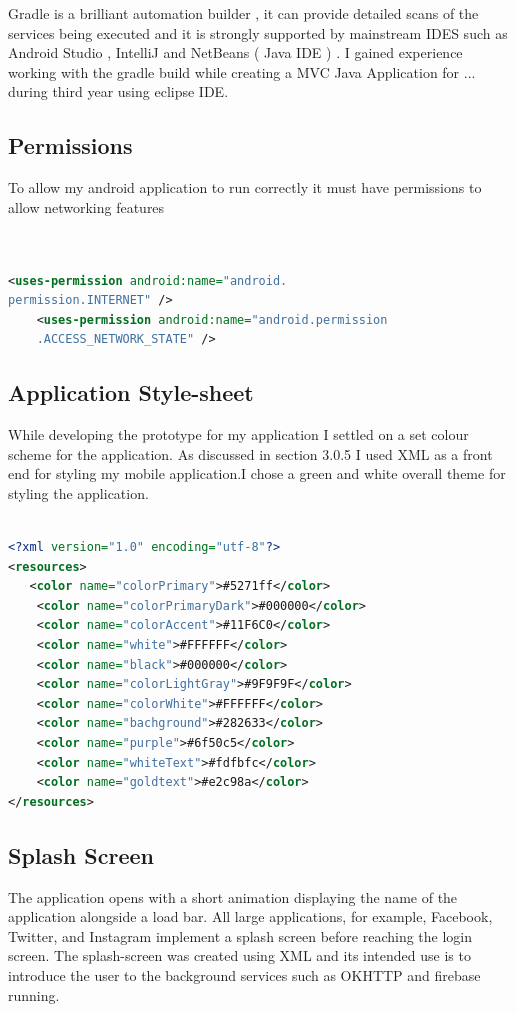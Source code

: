     Gradle is a brilliant automation builder , it can provide detailed scans of the services being executed  and it is strongly supported by mainstream  IDES such as Android Studio , IntelliJ and NetBeans ( Java IDE ) . I gained experience working with the gradle build while creating a MVC Java Application for ... during third year using eclipse IDE. 

    
\subsection{Permissions}
To allow my android application to run correctly it must have permissions to allow networking features

\begin{lstlisting}[language=Xml, caption=Android Permissions]


<uses-permission android:name="android.
permission.INTERNET" />
    <uses-permission android:name="android.permission
    .ACCESS_NETWORK_STATE" />

\end{lstlisting}


\subsection{Application Style-sheet}
While developing the prototype for my application I settled on a set colour scheme for the application. As discussed in section 3.0.5 I used XML as a front end for styling my mobile application.I chose a green and white overall theme for styling the application.

\begin{lstlisting}[language=Xml, caption=App Stytlesheet]

<?xml version="1.0" encoding="utf-8"?>
<resources>
   <color name="colorPrimary">#5271ff</color>
    <color name="colorPrimaryDark">#000000</color>
    <color name="colorAccent">#11F6C0</color>
    <color name="white">#FFFFFF</color>
    <color name="black">#000000</color>
    <color name="colorLightGray">#9F9F9F</color>
    <color name="colorWhite">#FFFFFF</color>
    <color name="bachground">#282633</color>
    <color name="purple">#6f50c5</color>
    <color name="whiteText">#fdfbfc</color>
    <color name="goldtext">#e2c98a</color>
</resources>
\end{lstlisting}




\subsection{Splash Screen}
The application opens with a short animation displaying the name of the application alongside a load bar. All large applications, for example, Facebook, Twitter, and Instagram implement a splash screen before reaching the login screen. The splash-screen was created using XML and its intended use is to introduce the user to the background services such as OKHTTP and firebase running.

